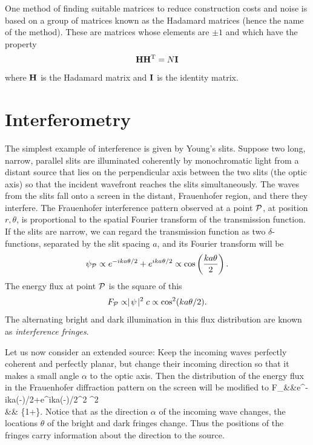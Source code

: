 One method of finding suitable matrices to reduce construction costs and noise is based on a group of matrices known as the Hadamard matrices (hence the name of the method). These are matrices whose elements are $\pm 1$ and which have the property
\[
{\bf H}{\bf H}^{\rm T}=N{\bf I}
\]
where ${\bf H}$ is the Hadamard matrix and ${\bf I}$ is the identity matrix. 

\section{Interferometry}

The simplest example of interference is given by Young's slits. Suppose two long,
narrow, parallel slits are illuminated coherently by monochromatic light from a distant
source that lies on the perpendicular axis between the two slits (the optic axis) so that the incident wavefront reaches the slits simultaneously. The waves from the slits fall onto a screen in the distant, Frauenhofer region, and there they interfere. The Frauenhofer 
interference pattern observed at a point ${\cal P}$, at position $r,\theta$, is proportional to the spatial Fourier transform of the transmission function. If the slits are 
narrow, we can regard the transmission function as two $\delta$-functions, separated
by the slit spacing $a$, and its Fourier transform will be
\[
\psi_{{\cal P}}\propto e^{-ika\theta/2}+e^{ika\theta/2}\propto\cos\left({ka\theta\over 2}\right).
\]
The energy flux at point ${\cal P}$ is the square of this
\[
F_{{\cal P}}\propto\mid\!\psi\!\mid^2c\propto\cos^2({ka\theta/2}).
\]
The alternating bright and dark illumination in this flux distribution are known as {\it interference fringes}. 

Let us now consider an extended source: Keep the incoming waves perfectly 
coherent and perfectly planar, but change their incoming direction so that it makes a small angle $\alpha$ to the optic axis. Then the distribution of the energy flux in the
Frauenhofer diffraction pattern on the screen will be modified to 
\bua
F_{}&\propto&\labs e^{-ika(\theta-\alpha)/2}+e^{ika(\theta-\alpha)/2}\rabs^2
      \propto\cos^2 \\
             &\propto& \{1+\}.
\eua
Notice that as the direction $\alpha$ of the incoming wave changes, the locations $\theta$ of the bright and dark fringes change. Thus the positions of the fringes carry information about the direction to the source. 

